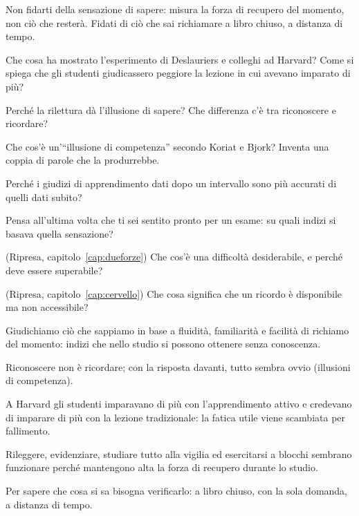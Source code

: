 \begin{daricordare}
Non fidarti della sensazione di sapere: misura la forza di recupero del
momento, non ciò che resterà. Fidati di ciò che sai richiamare a libro
chiuso, a distanza di tempo.
\end{daricordare}

\begin{domande}
  \item Che cosa ha mostrato l'esperimento di Deslauriers e colleghi ad
        Harvard? Come si spiega che gli studenti giudicassero peggiore
        la lezione in cui avevano imparato di più?
  \item Perché la rilettura dà l'illusione di sapere? Che differenza
        c'è tra riconoscere e ricordare?
  \item Che cos'è un'\enquote{illusione di competenza} secondo Koriat e
        Bjork? Inventa una coppia di parole che la produrrebbe.
  \item Perché i giudizi di apprendimento dati dopo un intervallo sono
        più accurati di quelli dati subito?
  \item Pensa all'ultima volta che ti sei sentito pronto per un esame:
        su quali indizi si basava quella sensazione?
  \item (Ripresa, capitolo~\ref{cap:dueforze}) Che cos'è una
        difficoltà desiderabile, e perché deve essere superabile?
  \item (Ripresa, capitolo~\ref{cap:cervello}) Che cosa significa che
        un ricordo è disponibile ma non accessibile?
\end{domande}

\begin{sintesi}
  \item Giudichiamo ciò che sappiamo in base a fluidità, familiarità e
        facilità di richiamo del momento: indizi che nello studio si
        possono ottenere senza conoscenza.
  \item Riconoscere non è ricordare; con la risposta davanti, tutto
        sembra ovvio (illusioni di competenza).
  \item A Harvard gli studenti imparavano di più con l'apprendimento
        attivo e credevano di imparare di più con la lezione
        tradizionale: la fatica utile viene scambiata per fallimento.
  \item Rileggere, evidenziare, studiare tutto alla vigilia ed
        esercitarsi a blocchi sembrano funzionare perché mantengono
        alta la forza di recupero durante lo studio.
  \item Per sapere che cosa si sa bisogna verificarlo: a libro chiuso,
        con la sola domanda, a distanza di tempo.
\end{sintesi}

\finecapitolo

